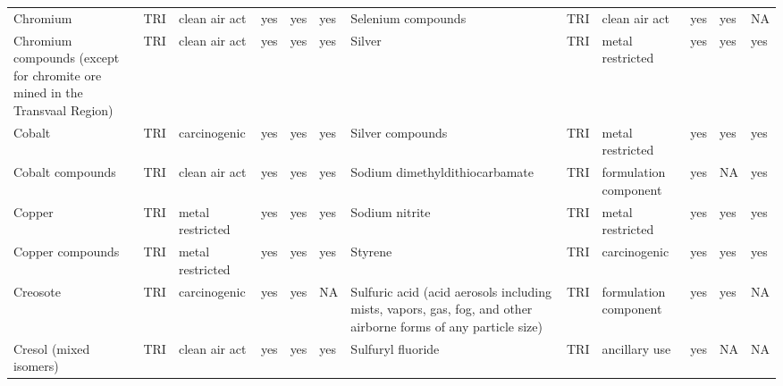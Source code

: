 \begin{table}[H]
{\begin{tabular}{llllllllllll}
            Chromium                                                                   & TRI            & clean air act         & yes    & yes     & yes  & Selenium compounds                                                                                                 & TRI            & clean air act         & yes    & yes & NA\\
            Chromium compounds (except for chromite ore mined in the Transvaal Region) & TRI            & clean air act & yes & yes & yes & Silver & TRI & metal restricted & yes & yes & yes\\
            Cobalt                                                                     & TRI            & carcinogenic          & yes    & yes     & yes  & Silver compounds                                                                                                   & TRI            & metal restricted      & yes    & yes & yes\\
            Cobalt compounds                                                           & TRI            & clean air act         & yes    & yes     & yes  & Sodium dimethyldithiocarbamate                                                                                     & TRI & formulation component & yes & NA & yes\\
            Copper                                                                     & TRI            & metal restricted      & yes    & yes     & yes  & Sodium nitrite                                                                                                     & TRI            & metal restricted      & yes    & yes & yes\\
            Copper compounds                                                           & TRI            & metal restricted      & yes    & yes     & yes  & Styrene                                                                                                            & TRI            & carcinogenic          & yes    & yes & yes\\
            Creosote                                                                   & TRI            & carcinogenic          & yes    & yes     & NA   & Sulfuric acid (acid aerosols including mists, vapors, gas, fog, and other airborne forms of any particle size) & TRI & formulation component & yes & yes & NA\\
            Cresol (mixed isomers)                                                     & TRI            & clean air act         & yes    & yes     & yes  & Sulfuryl fluoride                                                                                                  & TRI            & ancillary use & yes & NA & NA\\

\end{tabular}}
\end{table}
